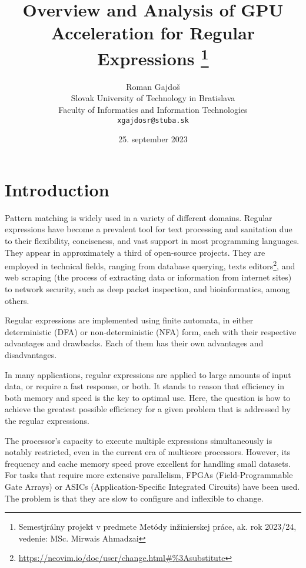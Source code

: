 \documentclass[10pt,onecolumn,twoside,english,a4paper]{article}
\title{Overview and Analysis of GPU Acceleration for Regular Expressions
\thanks{Semestjrálny projekt v predmete Metódy inžinierskej práce, ak. rok 2023/24, vedenie: MSc. Mirwais Ahmadzai}} %
\author{Roman Gajdoš\\[2pt]
	{\small Slovak University of Technology in Bratislava}\\
	{\small Faculty of Informatics and Information Technologies}\\
	{\small \texttt{xgajdosr@stuba.sk}}
	}
\date{\small 25. september 2023} %
\begin{document}
\maketitle

\begin{abstract}
	\blindtext[2]

\end{abstract}



\section{Introduction}

Pattern matching is widely used in a variety of different domains. Regular expressions have become a prevalent tool for text processing and sanitation due to their flexibility, conciseness, and vast support in most programming languages\cite{Chapman:Usage}. They appear in approximately a third of open-source projects\cite{Davis:Re-use}. They are employed in technical fields, ranging from database querying\cite{István:databases-regex}, texts editors\footnote{\url{https://neovim.io/doc/user/change.html\#\%3Asubstitute}}, and web scraping (the process of extracting data or information from internet sites)\cite{Gunawan2019/03} to network security, such as deep packet inspection\cite{becchi2008workload}, and bioinformatics\cite{prieto2014prediction}, among others.

Regular expressions are implemented using finite automata, in either deterministic (DFA) or non-deterministic (NFA) form, each with their respective advantages and drawbacks. Each of them has their own advantages and disadvantages\cite{Becchi:regex_large_dataset,Nourian:DemystifyingFSA,Zu:GPU-NFA}.

In many applications, regular expressions are applied to large amounts of input data, or require a fast response, or both. It stands to reason that efficiency in both memory and speed is the key to optimal use\cite{Xia:FSA-scaling}.
Here, the question is how to achieve the greatest possible efficiency for a given problem that is addressed by the regular expressions.

The processor's capacity to execute multiple expressions simultaneously is notably restricted, even in the current era of multicore processors\cite{Lee:myths}. However, its frequency and cache memory speed prove excellent for handling small datasets. For tasks that require more extensive parallelism, FPGAs (Field-Programmable Gate Arrays) or ASICs (Application-Specific Integrated Circuits) have been used. The problem is that they are slow to configure\cite{XU:regex_alg_slow} and inflexible to change\cite{fuchs2019accelerator,Liu:Asynchronous}.
\end{document}
